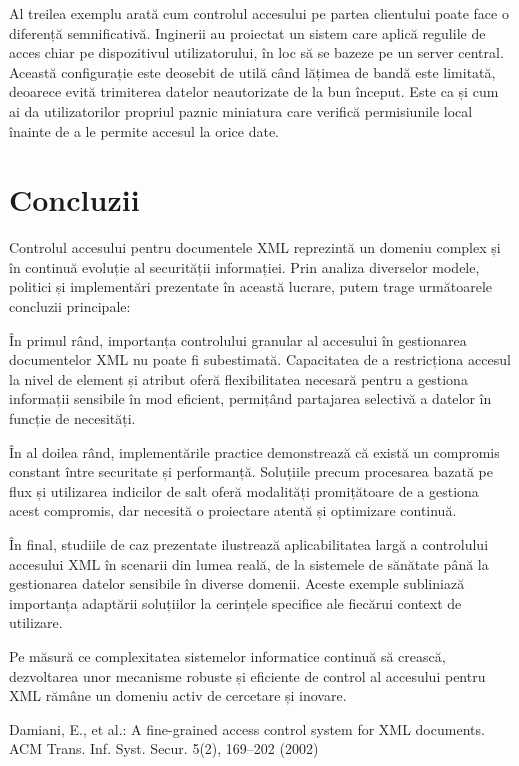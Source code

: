 \documentclass[runningheads]{llncs}
\begin{document}
\begin{spacing}{1.5}
Al treilea exemplu arată cum controlul accesului pe partea clientului poate face o diferență semnificativă. Inginerii au proiectat un sistem care aplică regulile de acces chiar pe dispozitivul utilizatorului, în loc să se bazeze pe un server central. Această configurație este deosebit de utilă când lățimea de bandă este limitată, deoarece evită trimiterea datelor neautorizate de la bun început. Este ca și cum ai da utilizatorilor propriul paznic miniatura care verifică permisiunile local înainte de a le permite accesul la orice date.

\section{Concluzii}
Controlul accesului pentru documentele XML reprezintă un domeniu complex și în continuă evoluție al securității informației. Prin analiza diverselor modele, politici și implementări prezentate în această lucrare, putem trage următoarele concluzii principale:

În primul rând, importanța controlului granular al accesului în gestionarea documentelor XML nu poate fi subestimată. Capacitatea de a restricționa accesul la nivel de element și atribut oferă flexibilitatea necesară pentru a gestiona informații sensibile în mod eficient, permițând partajarea selectivă a datelor în funcție de necesități.

În al doilea rând, implementările practice demonstrează că există un compromis constant între securitate și performanță. Soluțiile precum procesarea bazată pe flux și utilizarea indicilor de salt oferă modalități promițătoare de a gestiona acest compromis, dar necesită o proiectare atentă și optimizare continuă.

În final, studiile de caz prezentate ilustrează aplicabilitatea largă a controlului accesului XML în scenarii din lumea reală, de la sistemele de sănătate până la gestionarea datelor sensibile în diverse domenii. Aceste exemple subliniază importanța adaptării soluțiilor la cerințele specifice ale fiecărui context de utilizare.

Pe măsură ce complexitatea sistemelor informatice continuă să crească, dezvoltarea unor mecanisme robuste și eficiente de control al accesului pentru XML rămâne un domeniu activ de cercetare și inovare.

\begin{thebibliography}{9}

    Damiani, E., et al.: A fine-grained access control system for XML documents. ACM Trans. Inf. Syst. Secur. 5(2), 169--202 (2002)
    

\end{thebibliography}
\end{spacing}
\end{document}
